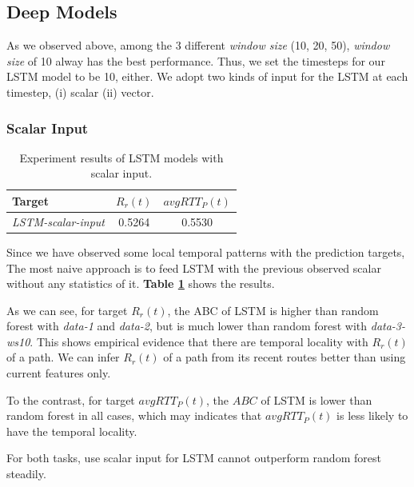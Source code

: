 \documentclass[sigconf]{acmart}
\begin{document}
\subsection{Deep Models}

 As we observed above, among the 3 different \textit{window size} (10, 20, 50), \textit{window size} of 10 alway has the best performance. Thus, we set the timesteps for our LSTM model to be 10, either.  We adopt two kinds of input for the LSTM at each timestep, (i) scalar (ii) vector.
\subsubsection{Scalar Input}
\begin{table}[t]
	\centering
	\begin{tabular}{lcc}
		\toprule
		{Target} &{$R_r(t)$} &{$avgRTT_P(t)$}\\
		\midrule
		\textit{LSTM-scalar-input} & 0.5264& 0.5530  \\
		\bottomrule
	\end{tabular}
	\caption{ Experiment results of LSTM models with scalar input. }
	\label{tab:lstm-scalar}
\end{table}

Since we have observed some local temporal patterns with the prediction targets, The most naive approach is to feed LSTM with the previous observed scalar without any statistics of it. \textbf{Table \ref{tab:lstm-scalar}} shows the results.

As we can see, for target $R_r(t)$, the ABC of LSTM is higher than random forest with \textit{data-1} and \textit{data-2}, but is much lower than random forest with \textit{data-3-ws10}. This shows empirical evidence that there are temporal locality with $R_r(t)$ of a path. We can infer $R_r(t)$ of a path from its recent routes better than using current features only.

To the contrast, for target $avgRTT_P(t)$, the $ABC$ of LSTM is lower than random forest in all cases, which may indicates that $avgRTT_P(t)$ is less likely to have the temporal locality.

For both tasks, use scalar input for LSTM cannot outperform random forest steadily.
\end{document}

